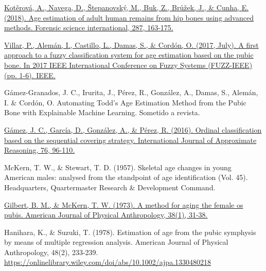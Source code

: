 \begin{thebibliography}{9}

	\href{https://www.sciencedirect.com/science/article/pii/S0379073818301440}{Kotěrová, A., Navega, D., Štepanovský, M., Buk, Z., Brůžek, J., \& Cunha, E. (2018). Age estimation of adult human remains from hip bones using advanced methods. Forensic science international, 287, 163-175.}



	\href{https://ieeexplore.ieee.org/abstract/document/8015760}{Villar, P., Alemán, I., Castillo, L., Damas, S., \& Cordón, O. (2017, July). A first approach to a fuzzy classification system for age estimation based on the pubic bone. In 2017 IEEE International Conference on Fuzzy Systems (FUZZ-IEEE) (pp. 1-6). IEEE.}


	Gámez-Granados, J. C., Irurita, J., Pérez, R., González, A., Damas, S., Alemán, I. \& Cordón, O. Automating Todd’s Age Estimation Method from the Pubic Bone with Explainable Machine Learning. Sometido a revista.


	\href{https://www.sciencedirect.com/science/article/pii/S0888613X16300706}{Gámez, J. C., García, D., González, A., \& Pérez, R. (2016). Ordinal classification based on the sequential covering strategy. International Journal of Approximate Reasoning, 76, 96-110.}



	McKern, T. W., \& Stewart, T. D. (1957). Skeletal age changes in young American males: analysed from the standpoint of age identification (Vol. 45). Headquarters, Quartermaster Research \& Development Command.


	\href{https://onlinelibrary.wiley.com/doi/abs/10.1002/ajpa.1330380109}{Gilbert, B. M., \& McKern, T. W. (1973). A method for aging the female os pubis. American Journal of Physical Anthropology, 38(1), 31-38.}


	Hanihara, K., \& Suzuki, T. (1978). Estimation of age from the pubic symphysis by means of multiple regression analysis. American Journal of Physical Anthropology, 48(2), 233-239. \url{https://onlinelibrary.wiley.com/doi/abs/10.1002/ajpa.1330480218}



\end{thebibliography}
